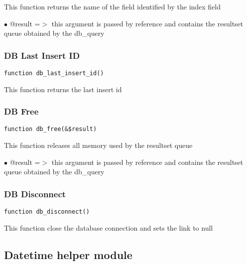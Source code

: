 \documentclass[a4paper]{article}
\begin{document}
This function returns the name of the field identified by the index field

\begin{compactitem}
\item[\color{myblue}$\bullet$] @result =$>$ this argument is passed by reference and contains the resultset queue
           obtained by the db\_query
\end{compactitem}

\hypertarget{toc94}{}
\subsubsection{DB Last Insert ID}

\begin{lstlisting}
function db_last_insert_id()
\end{lstlisting}

This function returns the last insert id

\hypertarget{toc95}{}
\subsubsection{DB Free}

\begin{lstlisting}
function db_free(&$result)
\end{lstlisting}

This function releases all memory used by the resultset queue

\begin{compactitem}
\item[\color{myblue}$\bullet$] @result =$>$ this argument is passed by reference and contains the resultset queue
           obtained by the db\_query
\end{compactitem}

\hypertarget{toc96}{}
\subsubsection{DB Disconnect}

\begin{lstlisting}
function db_disconnect()
\end{lstlisting}

This function close the database connection and sets the link to null

\hypertarget{toc97}{}
\subsection{Datetime helper module}
\end{document}

